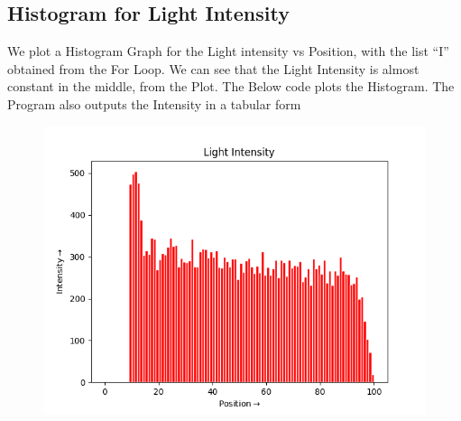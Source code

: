 \documentclass[12pt, a4paper]{report}
\begin{document}


\subsection{Histogram for Light Intensity}
We plot a Histogram Graph for the Light intensity vs Position, with the list “I” obtained from the For Loop. We can see that the Light Intensity is almost constant in the middle, from the Plot. The Below code plots the Histogram. The Program also outputs the Intensity in a tabular form
\noindent

\begin{figure}[h!]
    \centering
    \includegraphics[scale=0.5125]{fig1.png} 
    \caption{}
    \label{fig:my_label}
\end{figure}
\end{document}
